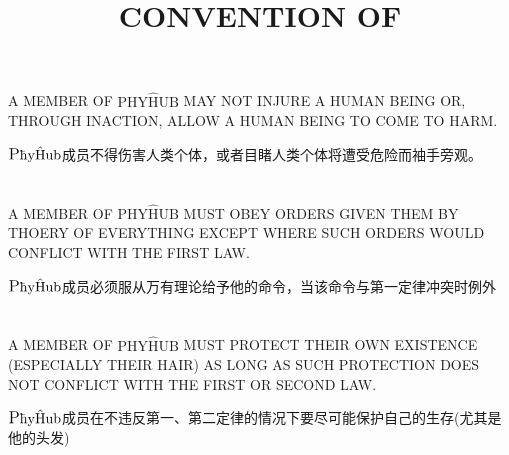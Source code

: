 \documentclass{ctexart}
\title{CONVENTION OF \PHYHUB{}\\%
\PhyHub公约}
\author{\PhyHub}
\renewcommand*{\hbar}{{\mkern-1mu\mathchar'26\mkern-8mu\mathrm{h}}}
\newcommand{\PhyHub}{$%
\text{\large$\mathrm P$}\mathrm{\hbar y} 
    {\hat{\mathrm H} \mathrm{ub}}
    $}
\newcommand{\PHYHUB}{$%
    \mathrm{PHY\hat HUB}
$}
\begin{document}
\maketitle
\section{ }
\begin{center}
    A MEMBER OF \PHYHUB{} MAY NOT INJURE A HUMAN BEING OR, THROUGH INACTION, ALLOW A HUMAN BEING TO COME TO HARM.

    \PhyHub{}成员不得伤害人类个体，或者目睹人类个体将遭受危险而袖手旁观。
\end{center}


\section{ }
\begin{center}
    A MEMBER OF \PHYHUB{} MUST OBEY ORDERS GIVEN THEM BY THOERY OF EVERYTHING EXCEPT WHERE SUCH ORDERS WOULD CONFLICT WITH THE FIRST LAW.

    \PhyHub{}成员必须服从万有理论给予他的命令，当该命令与第一定律冲突时例外
\end{center}

\section{ }
\begin{center}
    A MEMBER OF \PHYHUB{} MUST PROTECT THEIR OWN EXISTENCE
    (ESPECIALLY THEIR HAIR) AS LONG AS SUCH PROTECTION DOES NOT CONFLICT WITH THE FIRST OR SECOND LAW.

    \PhyHub{}成员在不违反第一、第二定律的情况下要尽可能保护自己的生存(尤其是他的头发)
\end{center}
\end{document}
